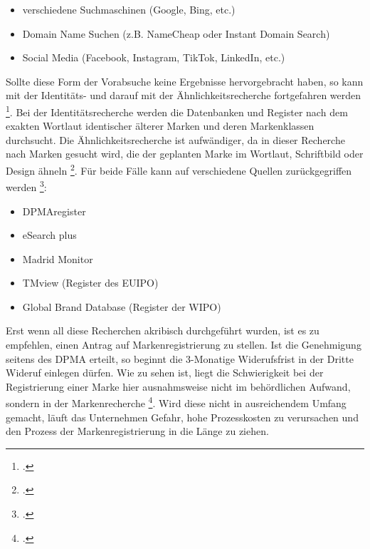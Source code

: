 \begin{itemize}
    \item verschiedene Suchmaschinen (Google, Bing, etc.)
    \item Domain Name Suchen (z.B. NameCheap oder Instant Domain Search)
    \item Social Media (Facebook, Instagram, TikTok, LinkedIn, etc.)
\end{itemize}
    
Sollte diese Form der Vorabsuche keine Ergebnisse hervorgebracht haben, so kann mit der Identitäts- und darauf mit der Ähnlichkeitsrecherche fortgefahren werden \footcite{plutte_markenrecherche_2015}. Bei der Identitätsrecherche werden die Datenbanken und Register nach dem exakten Wortlaut identischer älterer Marken und deren Markenklassen durchsucht. Die Ähnlichkeitsrecherche ist aufwändiger, da in dieser Recherche nach Marken gesucht wird, die der geplanten Marke im Wortlaut, Schriftbild oder Design ähneln \footcite{plutte_markenrecherche_2015}. Für beide Fälle kann auf verschiedene Quellen zurückgegriffen werden \footcite{oa_dpma_nodate-1}: 

\begin{itemize}
    \item DPMAregister
    \item eSearch plus
    \item Madrid Monitor
    \item TMview (Register des EUIPO)
    \item Global Brand Database (Register der WIPO)
\end{itemize}

Erst wenn all diese Recherchen akribisch durchgeführt wurden, ist es zu empfehlen, einen Antrag auf Markenregistrierung zu stellen. Ist die Genehmigung seitens des DPMA erteilt, so beginnt die 3-Monatige Widerufsfrist in der Dritte Wideruf einlegen dürfen. 
Wie zu sehen ist, liegt die Schwierigkeit bei der Registrierung einer Marke hier ausnahmsweise nicht im behördlichen Aufwand, sondern in der Markenrecherche \footcite{wolking_-_2007}. Wird diese nicht in ausreichendem Umfang gemacht, läuft das Unternehmen Gefahr, hohe Prozesskosten zu verursachen und den Prozess der Markenregistrierung in die Länge zu ziehen.